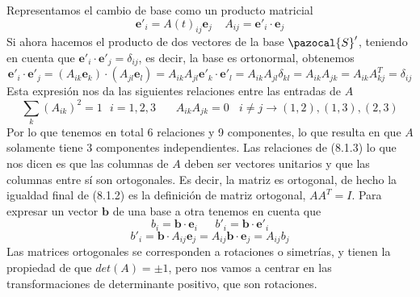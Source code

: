 Representamos el cambio de base como un producto matricial
\begin{equation} \label{6.1.1}
    \mathbf{e}'_i = A(t)_{ij} \mathbf{e}_j \ \ \ \ \ A_{ij} = \mathbf{e}'_i \cdot \mathbf{e}_j
\end{equation} 
Si ahora hacemos el producto de dos vectores de la base $\pazocal{S}'$, teniendo en cuenta que $\mathbf{e}'_i \cdot \mathbf{e}'_j = \delta_{ij}$, es decir, la base es ortonormal, obtenemos
\begin{equation} \label{6.1.1}
    \mathbf{e}'_i \cdot \mathbf{e}'_j = \left(A_{ik} \mathbf{e}_k\right)\cdot \left(A_{jl} \mathbf{e}_l\right) = A_{ik} A_{jl} \mathbf{e}'_k \cdot \mathbf{e}'_l = A_{ik} A_{jl} \delta_{kl} =  A_{ik} A_{jk} = A_{ik} A^T_{kj} = \delta_{ij}
\end{equation} 
Esta expresión nos da las siguientes relaciones entre las entradas de $A$
\begin{equation} \label{6.1.1}
    \sum_k (A_{ik})^2 = 1 \ \ \ i=1,2,3 \ \ \ \ \ \ \ \ A_{ik} A_{jk} = 0 \ \ \ \ i\neq j \rightarrow (1,2), (1,3), (2,3)
\end{equation} 
Por lo que tenemos en total 6 relaciones y 9 componentes, lo que resulta en que $A$ solamente tiene 3 componentes independientes. Las relaciones de (8.1.3) lo que nos dicen es que las columnas de $A$ deben ser vectores unitarios y que las columnas entre sí son ortogonales. Es decir, la matriz es ortogonal, de hecho la igualdad final de (8.1.2) es la definición de matriz ortogonal, $AA^T = I$.
\newpage
Para expresar un vector $\mathbf{b}$ de una base a otra tenemos en cuenta que
\begin{equation} \label{6.1.1}
    b_i = \mathbf{b} \cdot \mathbf{e}_i \ \ \ \ \ \ \ b'_i = \mathbf{b} \cdot \mathbf{e}'_i
\end{equation} 
\vspace{-20pt}
\begin{equation} \label{6.1.1}
    b'_i = \mathbf{b} \cdot A_{ij} \mathbf{e}_j = A_{ij} \mathbf{b} \cdot  \mathbf{e}_j = A_{ij} b_j
\end{equation} 
Las matrices ortogonales se corresponden a rotaciones o simetrías, y tienen la propiedad de que $det(A) = \pm 1$, pero nos vamos a centrar en las transformaciones de determinante positivo, que son rotaciones.
\vspace{-10pt}
